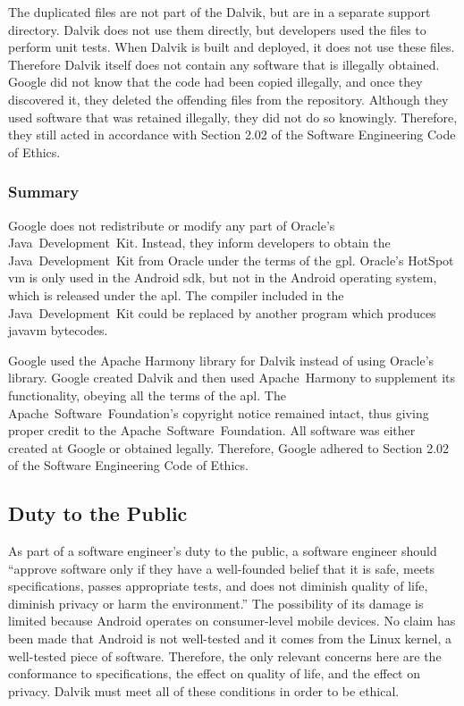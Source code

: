 \documentclass[11pt]{article}
\begin{document}
\begin{multicols}{2}
The duplicated files are not part of the Dalvik, but are in a separate support
directory.  Dalvik does not use them directly, but developers used the files to
perform unit tests.  When Dalvik is built and deployed, it does not use these
files.  Therefore Dalvik itself does not contain any software that is illegally
obtained.  Google did not know that the code had been copied illegally, and once
they discovered it, they deleted the offending files from the repository.
Although they used software that was retained illegally, they did not do so
knowingly.  Therefore, they still acted in accordance with Section 2.02 of the
Software Engineering Code of Ethics.


\subsubsection{Summary} %
\label{ssub:licensing-summary}

Google does not redistribute or modify any part of Oracle's
Java~Development~Kit.  Instead, they inform developers to obtain the
Java~Development~Kit from Oracle under the terms of the \gls{gpl}.  Oracle's
HotSpot \gls{vm} is only used in the Android \gls{sdk}, but not in the Android
operating system, which is released under the \gls{apl}.  The compiler included
in the Java~Development~Kit could be replaced by another program which produces
\gls{javavm} \glspl{bytecode}.

Google used the Apache Harmony \gls{library} for Dalvik instead of using
Oracle's \gls{library}.  Google created Dalvik and then used Apache~Harmony to
supplement its functionality, obeying all the terms of the \gls{apl}.  The
Apache~Software~Foundation's copyright notice remained intact, thus giving
proper credit to the Apache~Software~Foundation. All software was either created
at Google or obtained legally.  Therefore, Google adhered to Section 2.02 of the
Software Engineering Code of Ethics.



\subsection{Duty to the Public} %
\label{sub:public}

As part of a software engineer's duty to the public, a software engineer should
``approve software only if they have a well-founded belief that it is safe,
meets specifications, passes appropriate tests, and does not diminish quality of
life, diminish privacy or harm the environment.'' \cite[\S~1.03]{secode}  The
possibility of its damage is limited because Android operates on consumer-level
mobile devices.  No claim has been made that Android is not well-tested and it
comes from the Linux kernel, a well-tested piece of software.  Therefore, the
only relevant concerns here are the conformance to specifications, the effect on
quality of life, and the effect on privacy.  Dalvik must meet all of these
conditions in order to be ethical.


\end{multicols}
\end{document}

